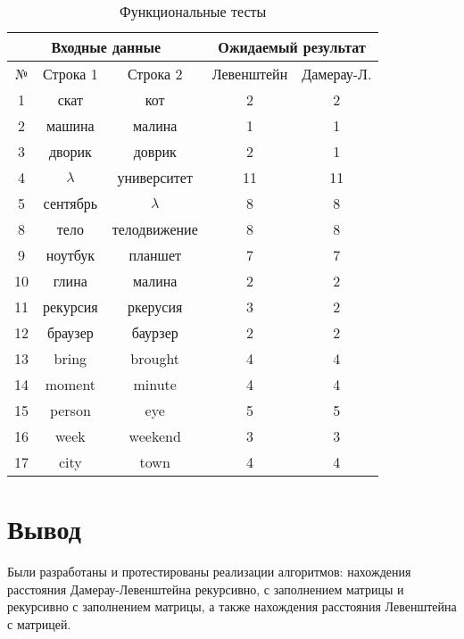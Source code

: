 \begin{table}[H]
	\begin{center}
		\caption{\label{tabular:functional_test} Функциональные тесты}
		\begin{tabular}{|c|c|c|c|c|}
			\hline
			\multicolumn{3}{|c|}{Входные данные}& \multicolumn{2}{c|}{Ожидаемый результат} \\
			\hline
			№&Строка 1&Строка 2&Левенштейн&Дамерау-Л. \\
			\hline
			1&скат&кот&2&2 \\
			\hline
			2&машина&малина&1&1 \\
			\hline
			3&дворик&доврик&2&1 \\
			\hline
			4&$\lambda$&университет&11&11 \\
			\hline
			5&сентябрь&$\lambda$&8&8 \\
			\hline
			8&тело&телодвижение&8&8 \\
			\hline
			9&ноутбук&планшет&7&7 \\
			\hline
			10&глина&малина&2&2 \\
			\hline
			11&рекурсия&ркерусия&3&2 \\
			\hline
			12&браузер&баурзер&2&2 \\
			\hline
			13&bring&brought&4&4 \\
			\hline
			14&moment&minute&4&4 \\ 
			\hline
			15&person&eye&5&5 \\
			\hline
			16&week&weekend&3&3 \\
			\hline 
			17&city&town&4&4 \\
			\hline
		\end{tabular}
	\end{center}
\end{table}


\section*{Вывод}

Были разработаны и протестированы реализации алгоритмов: нахождения расстояния Дамерау-Левенштейна рекурсивно, с заполнением матрицы и рекурсивно с заполнением матрицы, а также нахождения расстояния Левенштейна с матрицей.
